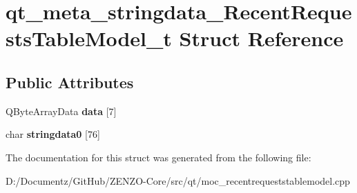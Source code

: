 \hypertarget{structqt__meta__stringdata___recent_requests_table_model__t}{}\section{qt\+\_\+meta\+\_\+stringdata\+\_\+\+Recent\+Requests\+Table\+Model\+\_\+t Struct Reference}
\label{structqt__meta__stringdata___recent_requests_table_model__t}
\subsection*{Public Attributes}
\begin{DoxyCompactItemize}
\item 
\mbox{\label{structqt__meta__stringdata___recent_requests_table_model__t_a3c20e0434ea34e68c919a58dd160d55f}} 
Q\+Byte\+Array\+Data {\bfseries data} \mbox{[}7\mbox{]}
\item 
\mbox{\label{structqt__meta__stringdata___recent_requests_table_model__t_a46122a6211a1ac49299b5001c921186c}} 
char {\bfseries stringdata0} \mbox{[}76\mbox{]}
\end{DoxyCompactItemize}


The documentation for this struct was generated from the following file\+:\begin{DoxyCompactItemize}
\item 
D\+:/\+Documentz/\+Git\+Hub/\+Z\+E\+N\+Z\+O-\/\+Core/src/qt/moc\+\_\+recentrequeststablemodel.\+cpp\end{DoxyCompactItemize}
